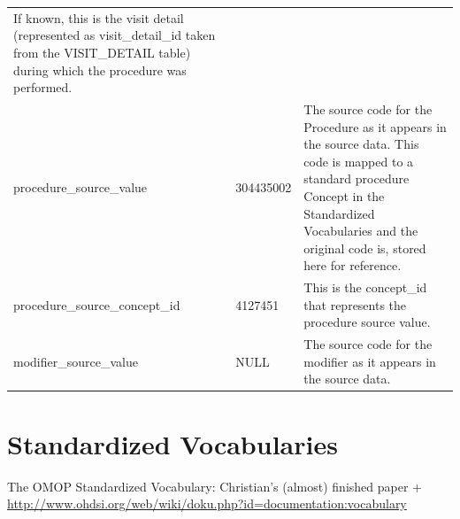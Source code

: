 \documentclass[]{book}
\begin{document}
\begin{longtable}[]{@{}lll@{}}
\begin{minipage}[t]{0.47\columnwidth}
If known, this is the visit detail (represented as visit\_detail\_id
taken from the VISIT\_DETAIL table) during which the procedure was
performed.\strut
\end{minipage}\tabularnewline
\begin{minipage}[t]{0.30\columnwidth}\raggedright\strut
procedure\_source\_value\strut
\end{minipage} & \begin{minipage}[t]{0.14\columnwidth}\raggedright\strut
304435002\strut
\end{minipage} & \begin{minipage}[t]{0.47\columnwidth}\raggedright\strut
The source code for the Procedure as it appears in the source data. This
code is mapped to a standard procedure Concept in the Standardized
Vocabularies and the original code is, stored here for reference.\strut
\end{minipage}\tabularnewline
\begin{minipage}[t]{0.30\columnwidth}\raggedright\strut
procedure\_source\_concept\_id\strut
\end{minipage} & \begin{minipage}[t]{0.14\columnwidth}\raggedright\strut
4127451\strut
\end{minipage} & \begin{minipage}[t]{0.47\columnwidth}\raggedright\strut
This is the concept\_id that represents the procedure source
value.\strut
\end{minipage}\tabularnewline
\begin{minipage}[t]{0.30\columnwidth}\raggedright\strut
modifier\_source\_value\strut
\end{minipage} & \begin{minipage}[t]{0.14\columnwidth}\raggedright\strut
NULL\strut
\end{minipage} & \begin{minipage}[t]{0.47\columnwidth}\raggedright\strut
The source code for the modifier as it appears in the source data.\strut
\end{minipage}\tabularnewline
\bottomrule
\end{longtable}

\chapter{Standardized Vocabularies}\label{StandardizedVocabularies}

The OMOP Standardized Vocabulary: Christian's (almost) finished paper +
\url{http://www.ohdsi.org/web/wiki/doku.php?id=documentation:vocabulary}
\end{document}
